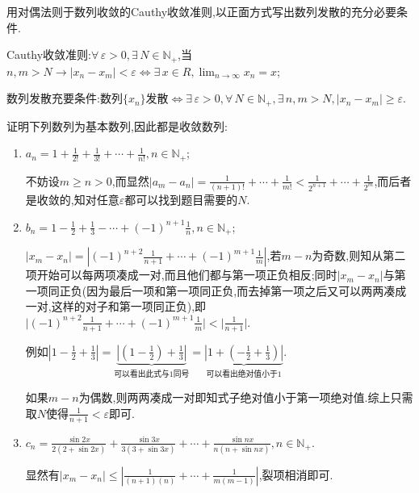 \documentclass[cn,chinese,fontset]{elegantbook}
\begin{document}
      \hypertarget{2.4.p.2}{}
      \begin{exercise}
          用对偶法则于数列收敛的Cauthy收敛准则,以正面方式写出数列发散的充分必要条件.
      \end{exercise}
      \begin{solution}

          Cauthy收敛准则:$\forall\, \varepsilon>0,\exists\, N\in \mathbb{N}_+$,当$ n,m>N\rightarrow\lvert x_n-x_m\rvert<\varepsilon\Longleftrightarrow \exists\, x\in R,\lim_{n\to\infty}x_n=x$;

          数列发散充要条件:数列$\{x_n\}$发散$\Longleftrightarrow \exists\, \varepsilon>0,\forall\, N\in \mathbb{N}_+,\exists\, n,m>N,\lvert x_n-x_m\rvert\geqslant \varepsilon$.
      \end{solution}

      \begin{exercise}
          证明下列数列为基本数列,因此都是收敛数列:
          \begin{enumerate}
              \item $a_n=1+\frac{1}{2!}+\frac{1}{3!}+\cdots+\frac{1}{n!},n\in \mathbb{N}_+$;
                    \begin{solution}
                        不妨设$m\geqslant n>0$,而显然$\lvert a_m-a_n\rvert=\frac{1}{(n+1)!}+\cdots+\frac{1}{m!}<\frac{1}{2^{n+1}}+\cdots+\frac{1}{2^m}$,而后者是收敛的,知对任意$\varepsilon$都可以找到题目需要的$N$.
                    \end{solution}\item $b_n=1-\frac{1}{2}+\frac{1}{3}-\cdots+(-1)^{n+1}\frac{1}{n},n\in \mathbb{N}_+$;
                    \begin{solution}
                        $\lvert x_m-x_n\rvert=\left|(-1)^{n+2}\frac{1}{n+1}+\cdots+(-1)^{m+1}\frac{1}{m}\right|$,若$m-n$为奇数,则知从第二项开始可以每两项凑成一对,而且他们都与第一项正负相反;同时$\lvert x_m-x_n\rvert$与第一项同正负(因为最后一项和第一项同正负,而去掉第一项之后又可以两两凑成一对,这样的对子和第一项同正负),即$\big\lvert (-1)^{n+2}\frac{1}{n+1}+\cdots+(-1)^{m+1}\frac{1}{m}\big\rvert<\lvert \frac{1}{n+1}\rvert$.

                        例如$\left|1-\frac{1}{2}+\frac{1}{3}\right|=\underbrace{\left|(1-\frac{1}{2})+\frac{1}{3}\right|}_{\text{可以看出此式与1同号}}=\underbrace{\left|1+(-\frac{1}{2}+\frac{1}{3})\right|}_{\text{可以看出绝对值小于1}}$.

                        如果$m-n$为偶数,则两两凑成一对即知式子绝对值小于第一项绝对值.综上只需取$N$使得$\frac{1}{n+1}<\varepsilon$即可.
                    \end{solution}\item $c_n=\frac{\sin2x}{2(2+\sin2x)}+\frac{\sin3x}{3(3+\sin3x)}+\cdots+\frac{\sin nx}{n(n+\sin nx)},n\in \mathbb{N}_+$.
                    \begin{solution}
                        显然有$\left|x_m-x_n\right|\leqslant\left|\frac{1}{(n+1)(n)}+\cdots+\frac{1}{m(m-1)}\right|$,裂项相消即可.
                    \end{solution}
          \end{enumerate}
      \end{exercise}
\end{document}
